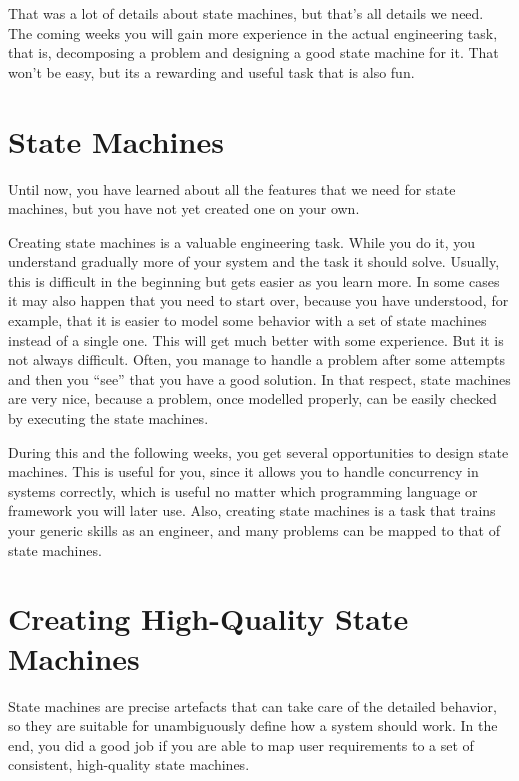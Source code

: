 \documentclass[10pt, twoside, twocolumn]{book}
\begin{document}
That was a lot of details about state machines, but that's all details
we need. The coming weeks you will gain more experience in the actual
engineering task, that is, decomposing a problem and designing a good
state machine for it. That won't be easy, but its a rewarding and useful
task that is also fun.

\hypertarget{state-machines}{%
\section{State Machines}\label{state-machines}}

Until now, you have learned about all the features that we need for
state machines, but you have not yet created one on your own.

Creating state machines is a valuable engineering task. While you do it,
you understand gradually more of your system and the task it should
solve. Usually, this is difficult in the beginning but gets easier as
you learn more. In some cases it may also happen that you need to start
over, because you have understood, for example, that it is easier to
model some behavior with a set of state machines instead of a single
one. This will get much better with some experience. But it is not
always difficult. Often, you manage to handle a problem after some
attempts and then you ``see'' that you have a good solution. In that
respect, state machines are very nice, because a problem, once modelled
properly, can be easily checked by executing the state machines.

During this and the following weeks, you get several opportunities to
design state machines. This is useful for you, since it allows you to
handle concurrency in systems correctly, which is useful no matter which
programming language or framework you will later use. Also, creating
state machines is a task that trains your generic skills as an engineer,
and many problems can be mapped to that of state machines.

\hypertarget{creating-high-quality-state-machines}{%
\section{Creating High-Quality State
Machines}\label{creating-high-quality-state-machines}}

State machines are precise artefacts that can take care of the detailed
behavior, so they are suitable for unambiguously define how a system
should work. In the end, you did a good job if you are able to map user
requirements to a set of consistent, high-quality state machines.
\end{document}
